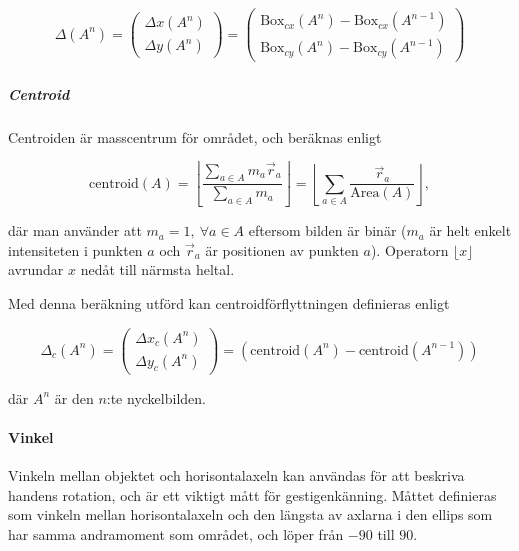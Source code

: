 \documentclass[../rapport_MVEX01-11-05]{subfiles}
\begin{document}
\begin{gather*}
  \Delta (A^n) =
  \begin{pmatrix}
    \Delta x(A^n)\\[3pt]
    \Delta y(A^n)
  \end{pmatrix}
  =
  \begin{pmatrix}
    \textrm{Box}_{cx}(A^n) - \textrm{Box}_{cx}(A^{n-1})\\[3pt]
    \textrm{Box}_{cy}(A^n) - \textrm{Box}_{cy}(A^{n-1})
  \end{pmatrix}
\end{gather*}

\subparagraph{Centroid}

Centroiden är masscentrum för området, och beräknas enligt

\begin{equation*}
  \textrm{centroid}(A) = \left\lfloor\frac{
    \sum\limits_{a\in A}m_a\vec{r}_a
  }{
    \sum\limits_{a\in A}m_a
  }\right\rfloor =
  \left\lfloor\sum\limits_{a\in
  A}\frac{\vec{r}_a}{\textrm{Area}(A)}\right\rfloor,
\end{equation*}

där man använder att $m_a=1,\:\forall a\in A$ eftersom bilden är
binär ($m_a$ är helt enkelt intensiteten i punkten $a$ och
$\vec{r}_a$ är positionen av punkten $a$). Operatorn $\lfloor
x\rfloor$ avrundar $x$ nedåt till närmsta heltal.

Med denna beräkning utförd kan centroidförflyttningen definieras enligt

\begin{equation*}
  \Delta_c(A^n) = 
  \begin{pmatrix}
    \Delta x_c(A^n) \\[3pt]
    \Delta y_c(A^n)
   \end{pmatrix}
   = \left(\textrm{centroid}(A^n)-\textrm{centroid}(A^{n-1})\right)
\end{equation*}

där $A^n$ är den $n$:te nyckelbilden.

\paragraph{Vinkel}
\label{sss:vinkel}

Vinkeln mellan objektet och horisontalaxeln kan användas för att
beskriva handens rotation, och är ett viktigt mått för
gestigenkänning. Måttet definieras som vinkeln mellan horisontalaxeln
och den längsta av axlarna i den ellips som har samma andramoment som
området, och löper från $-90$\textdegree{} till $90$\textdegree{}.
\end{document}
